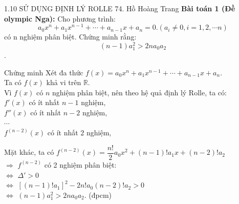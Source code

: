 \begin{frame}{{1.10 SỬ DỤNG ĐỊNH LÝ ROLLE \hspace{4cm}  74. Hồ Hoàng Trang}}
    \textbf{Bài toán 1 (Đề olympic Nga):} Cho phương trình:\\
    $$a_0x^n+a_1x^{n-1}+\cdots+a_{n-1}x+a_n=0.(a_i\ne 0, i=1,2,\cdots n)$$
    có n nghiệm phân biệt. Chứng minh rằng:
    $$(n-1)a_1^2>2na_0a_2$$.
    \pause
    \begin{block}{Chứng minh}
    \pause
        Xét đa thức $f(x)=a_0x^n+a_1x^{n-1}+\cdots+a_{n-1}x+a_n$.\\
        \pause
        Ta có $f(x)$ khả vi trên $\mathbb{R}$.\\ Vì $f(x)$ có $n$ nghiệm phân biệt, nên theo hệ quả định lý Rolle, ta có:\\
        $f'(x)$ có ít nhất $n-1$ nghiệm,\\
        \pause
        $f''(x)$ có ít nhất $n-2$ nghiệm,\\
        $\cdots$\\
        \pause
        $f^{(n-2)}(x)$ có ít nhất $2$ nghiệm,\\
        

         \end{block}
\end{frame}
\begin{frame}
\begin{block}

    Mặt khác, ta có $f^{(n-2)}(x)=\dfrac{n!}{2}a_0x^2+(n-1)!a_1x+(n-2)!a_2$\\
     $\Rightarrow$ $f^{(n-2)}$ có 2 nghiệm phân biệt:\\
     \pause
        $\Leftrightarrow$ $\Delta'>0$\\
        $\Leftrightarrow$ $\left[(n-1)!a_1\right]^2-2n!a_0(n-2)!a_2>0$\\
        $\Leftrightarrow$ $(n-1)a_1^2>2na_0a_2.$ (đpcm)
\end{block}
\end{frame}
